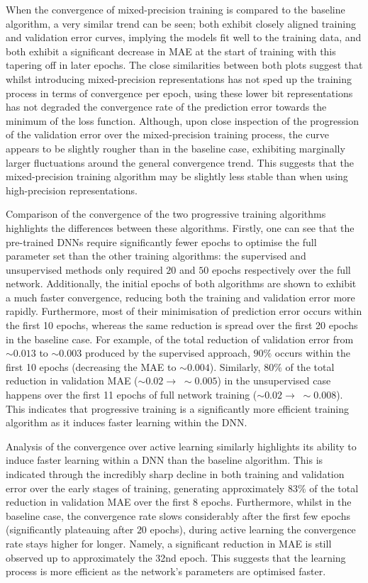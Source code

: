 \documentclass[a4paper, 11pt]{report}
\begin{document}
    When the convergence of mixed-precision training is compared to the baseline algorithm, a very similar trend can be seen; both exhibit closely aligned training and validation error curves, implying the models fit well to the training data, and both exhibit a significant decrease in MAE at the start of training with this tapering off in later epochs. The close similarities between both plots suggest that whilst introducing mixed-precision representations has not sped up the training process in terms of convergence per epoch, using these lower bit representations has not degraded the convergence rate of the prediction error towards the minimum of the loss function. Although, upon close inspection of the progression of the validation error over the mixed-precision training process, the curve appears to be slightly rougher than in the baseline case, exhibiting marginally larger fluctuations around the general convergence trend. This suggests that the mixed-precision training algorithm may be slightly less stable than when using high-precision representations.

    Comparison of the convergence of the two progressive training algorithms highlights the differences between these algorithms. Firstly, one can see that the pre-trained DNNs require significantly fewer epochs to optimise the full parameter set than the other training algorithms: the supervised and unsupervised methods only required $20$ and $50$ epochs respectively over the full network. Additionally, the initial epochs of both algorithms are shown to exhibit a much faster convergence, reducing both the training and validation error more rapidly. Furthermore, most of their minimisation of prediction error occurs within the first 10 epochs, whereas the same reduction is spread over the first 20 epochs in the baseline case. For example, of the total reduction of validation error from $\sim \! 0.013$ to $\sim \! 0.003$ produced by the supervised approach, $90\%$ occurs within the first 10 epochs (decreasing the MAE to $\sim \! 0.004$). Similarly, $80\%$ of the total reduction in validation MAE ($\sim \! 0.02 \to \; \sim \! 0.005$) in the unsupervised case happens over the first 11 epochs of full network training ($\sim \! 0.02 \to \; \sim \! 0.008$). This indicates that progressive training is a significantly more efficient training algorithm as it induces faster learning within the DNN.

    Analysis of the convergence over active learning similarly highlights its ability to induce faster learning within a DNN than the baseline algorithm. This is indicated through the incredibly sharp decline in both training and validation error over the early stages of training, generating approximately $83\%$ of the total reduction in validation MAE over the first $8$ epochs. Furthermore, whilst in the baseline case, the convergence rate slows considerably after the first few epochs (significantly plateauing after $20$ epochs), during active learning the convergence rate stays higher for longer. Namely, a significant reduction in MAE is still observed up to approximately the 32nd epoch. This suggests that the learning process is more efficient as the network's parameters are optimised faster.
\end{document}
